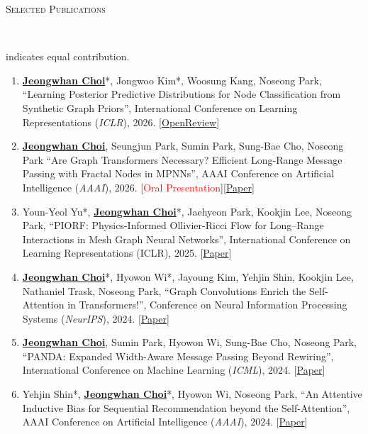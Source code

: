 \documentclass[10pt]{article}
\newenvironment{changemargin}[2]{
  \begin{list}{}{
    \setlength{\topsep}{0pt}
    \setlength{\leftmargin}{#1}
    \setlength{\rightmargin}{#2}
    \setlength{\listparindent}{\parindent}
    \setlength{\itemindent}{\parindent}
    \setlength{\parsep}{\parskip}
  }
  \item[]}{\end{list}
}
\newcommand{\lineover}{
	\begin{changemargin}{-0.05in}{-0.05in}
		\vspace*{-8pt}
		\hrulefill \\
		\vspace*{-2pt}
	\end{changemargin}
}
\newcommand{\header}[1]{
	\begin{changemargin}{-0.5in}{-0.5in}
		\scshape{#1}\\
  	\lineover
	\end{changemargin}
}
\newcommand{\RED}[1]{\textcolor{red}{#1}}
\newcommand{\textbu}[1]{\underline{\textbf{#1}}}
\newenvironment{body} {
	\vspace*{-16pt}
	\begin{changemargin}{-0.25in}{-0.5in}
  }
	{\end{changemargin}
}
\begin{document}
\clearpage


\header{Selected Publications}
\begin{body}
	\vspace{14pt}
{\small * indicates equal contribution.}
	\vspace{14pt}
\begin{enumerate}
    \item \textbu{Jeongwhan Choi}*, Jongwoo Kim*, Woosung Kang, Noseong Park, ``Learning Posterior Predictive Distributions for Node Classification from Synthetic Graph Priors'', International Conference on Learning Representations (\textit{ICLR}), 2026. [\href{https://openreview.net/forum?id=qkBBHixPow}{OpenReview}]
    \item \textbu{Jeongwhan Choi}, Seungjun Park, Sumin Park, Sung-Bae Cho, Noseong Park ``Are Graph Transformers Necessary? Efficient Long-Range Message Passing with Fractal Nodes in MPNNs'', AAAI Conference on Artificial Intelligence (\textit{AAAI}), 2026. [\RED{Oral Presentation}][\href{https://ojs.aaai.org/index.php/AAAI/article/view/39191}{Paper}]
    \item Youn-Yeol Yu*, \textbu{Jeongwhan Choi}*, Jaehyeon Park, Kookjin Lee, Noseong Park, ``PIORF: Physics-Informed Ollivier-Ricci Flow for Long–Range Interactions in Mesh Graph Neural Networks'', International Conference on Learning Representations (ICLR), 2025. [\href{https://openreview.net/forum?id=qkBBHixPow}{Paper}]
    \item \textbu{Jeongwhan Choi}*, Hyowon Wi*, Jayoung Kim, Yehjin Shin, Kookjin Lee, Nathaniel Trask, Noseong Park, ``Graph Convolutions Enrich the Self-Attention in Transformers!'', Conference on Neural Information Processing Systems (\textit{NeurIPS}), 2024. [\href{https://proceedings.neurips.cc/paper_files/paper/2024/hash/5eceb48c3bc8b5d936c05ff8e2ece65e-Abstract-Conference.html}{Paper}]
    \item \textbu{Jeongwhan Choi}, Sumin Park, Hyowon Wi, Sung-Bae Cho, Noseong Park, ``PANDA: Expanded Width-Aware Message Passing Beyond Rewiring'', International Conference on Machine Learning (\textit{ICML}), 2024. [\href{https://proceedings.mlr.press/v235/choi24f.html}{Paper}]
    \item Yehjin Shin*, \textbu{Jeongwhan Choi}*, Hyowon Wi, Noseong Park, ``An Attentive Inductive Bias for Sequential Recommendation beyond the Self-Attention'', AAAI Conference on Artificial Intelligence (\textit{AAAI}), 2024. [\href{https://ojs.aaai.org/index.php/AAAI/article/view/28747}{Paper}]

\end{enumerate}
\end{body}
\end{document}
